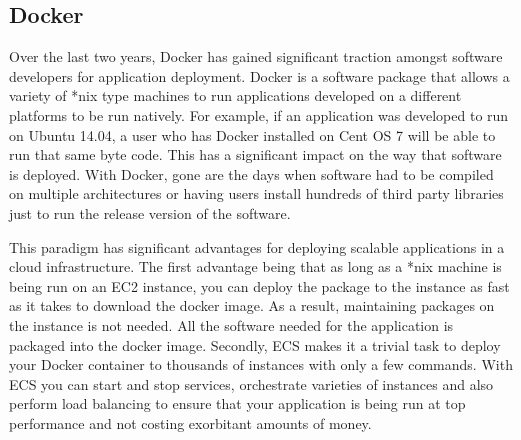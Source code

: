 \subsection{\label{subsection:docker}Docker}
Over the last two years, Docker has gained significant traction amongst software
developers for application deployment. Docker is a software package that allows
a variety of *nix type machines to run applications developed on a different
platforms to be run natively. For example, if an application was developed to run
on Ubuntu 14.04, a user who has Docker installed on Cent OS 7 will be able to
run that same byte code. This has a significant impact on the way that software
is deployed. With Docker, gone are the days when software had to be compiled on
multiple architectures or having users install hundreds of third
party libraries just to run the release version of the software.

This paradigm has significant advantages for deploying scalable applications
in a cloud infrastructure. The first advantage being that as long as a *nix
machine is being run on an EC2 instance, you can deploy the package to the instance as
fast as it takes to download the docker image. As a result, maintaining packages
on the instance is not needed. All the software needed for the application
is packaged into the docker image. Secondly, ECS makes it a trivial task to deploy
your Docker container to thousands of instances with only a few commands. With
ECS you can start and stop services, orchestrate varieties of instances and
also perform load balancing to ensure that your application is being run at
top performance and not costing exorbitant amounts of money.
